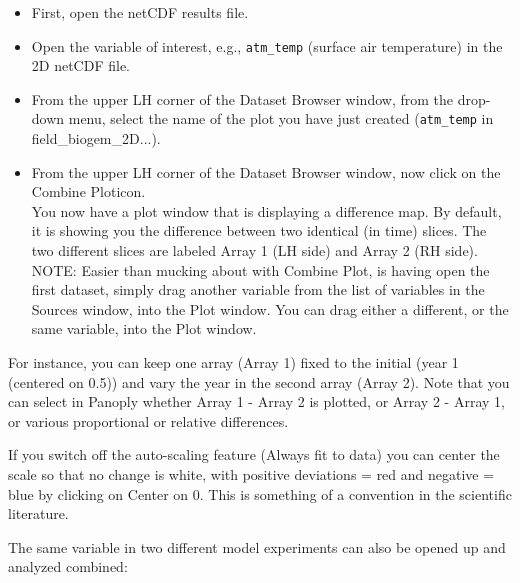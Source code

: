 \documentclass[11pt,fleqn]{book} %
\begin{document}
\begin{itemize}
\vspace{1mm}
\item First, open the netCDF results file.
\vspace{1mm}
\item Open the variable of interest, e.g., \texttt{atm\_temp} (surface air temperature) in the 2D netCDF file.
\vspace{-4mm}
\item From the upper LH corner of the Dataset Browser window, from the drop-down menu, select the name of the plot you have just created (\texttt{atm\_temp} in \footnotesize\textsf{field\_biogem\_2D}\normalsize ...).
\vspace{1mm}
\item From the upper LH corner of the Dataset Browser window, now click on the \footnotesize\textsf{Combine Plot}\normalsize icon.
\\ You now have a plot window that is displaying a difference map. By default, it is showing you the difference between two identical (in time) slices. The two different slices are labeled Array 1 (LH side) and Array 2 (RH side).
\\NOTE: Easier than mucking about with \footnotesize\textsf{Combine Plot}\normalsize, is having open the first dataset, simply drag another variable from the list of variables in the \footnotesize\textsf{Sources }\normalsize window, into the \footnotesize\textsf{Plot }\normalsize window. You can drag either a different, or the same variable, into the \footnotesize\textsf{Plot }\normalsize window.
\end{itemize}
\vspace{2mm}

For instance, you can keep one array (Array 1) fixed to the initial (year 1 (centered on 0.5)) and vary the year in the second array (Array 2). Note that you can select in Panoply whether Array 1 - Array 2 is plotted, or Array 2 - Array 1, or various proportional or relative differences.

If you switch off the auto-scaling feature (\footnotesize\textsf{Always fit to data}\normalsize) you can center the scale so that no change is white, with positive deviations = red and negative = blue by clicking on Center on 0. This is something of a convention in the scientific literature.

The same variable in two different model experiments can also be opened up and analyzed combined:
\end{document}
